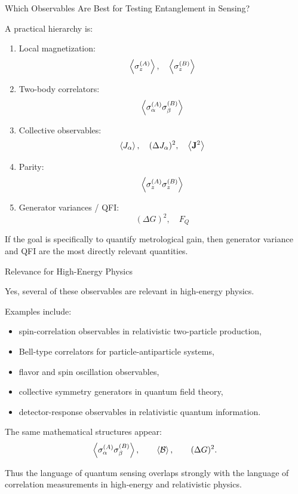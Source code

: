 \documentclass{beamer}
\begin{document}
\begin{frame}{Which Observables Are Best for Testing Entanglement in Sensing?}

A practical hierarchy is:

\begin{enumerate}
    \item Local magnetization:
    \[
    \expval{\sigma_z^{(A)}},\quad \expval{\sigma_z^{(B)}}
    \]
    \item Two-body correlators:
    \[
    \expval{\sigma_\alpha^{(A)}\sigma_\beta^{(B)}}
    \]
    \item Collective observables:
    \[
    \expval{J_\alpha},\quad (\Delta J_\alpha)^2,\quad \expval{\mathbf{J}^2}
    \]
    \item Parity:
    \[
    \expval{\sigma_z^{(A)}\sigma_z^{(B)}}
    \]
    \item Generator variances / QFI:
    \[
    (\Delta G)^2,\quad F_Q
    \]
\end{enumerate}

If the goal is specifically to quantify metrological gain, then
generator variance and QFI are the most directly relevant quantities.

\end{frame}

\begin{frame}{Relevance for High-Energy Physics}

Yes, several of these observables are relevant in high-energy physics.

Examples include:
\begin{itemize}
    \item spin-correlation observables in relativistic two-particle production,
    \item Bell-type correlators for particle-antiparticle systems,
    \item flavor and spin oscillation observables,
    \item collective symmetry generators in quantum field theory,
    \item detector-response observables in relativistic quantum information.
\end{itemize}

The same mathematical structures appear:
\[
\expval{\sigma_\alpha^{(A)}\sigma_\beta^{(B)}},\qquad
\expval{\mathcal{B}},\qquad
(\Delta G)^2.
\]

Thus the language of quantum sensing overlaps strongly with the language of
correlation measurements in high-energy and relativistic physics.

\end{frame}
\end{document}
